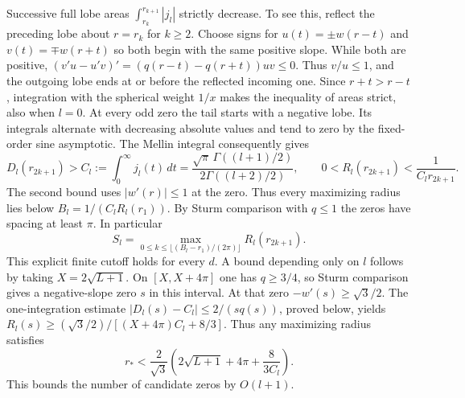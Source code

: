 \documentclass[11pt,a4paper]{article}
\theoremstyle{remark}\newtheorem{remark}[theorem]{Remark}
\numberwithin{equation}{section}
\begin{document}
Successive full lobe areas $\int_{r_k}^{r_{k+1}}|j_l|$ strictly decrease.
To see this, reflect the preceding lobe about $r=r_k$ for $k\ge2$.
Choose signs for $u(t)=\pm w(r-t)$ and $v(t)=\mp w(r+t)$ so both begin
with the same positive slope. While both are positive,
$(v'u-u'v)'=(q(r-t)-q(r+t))uv\le0$.
Thus $v/u\le1$, and the outgoing lobe ends at or before the reflected
incoming one. Since $r+t>r-t$, integration with the spherical weight $1/x$
makes the inequality of areas strict, also when $l=0$.
At every odd zero the tail starts with a negative lobe. Its integrals
alternate with decreasing absolute values and tend to zero
by the fixed-order sine asymptotic. The Mellin integral
\cite[eq.~10.22.43]{BBDLMF} consequently gives
\begin{equation}
 D_l(r_{2k+1})>C_l:=\int_0^\infty j_l(t)\,dt
 =\frac{\sqrt\pi\,\Gamma((l+1)/2)}{2\Gamma((l+2)/2)},\qquad
 0<R_l(r_{2k+1})<\frac{1}{C_l r_{2k+1}} .
 \label{eq:bb-tail}
\end{equation}
The second bound uses $|w'(r)|\le1$ at the zero.
Thus every maximizing radius lies below
$B_l=1/(C_lR_l(r_1))$. By Sturm comparison with $q\le1$ the zeros have
spacing at least $\pi$. In particular
\[
 S_l=\max_{0\le k\le \lfloor (B_l-r_1)/(2\pi)\rfloor}R_l(r_{2k+1}).
\]
This explicit finite cutoff holds for every $d$. A bound depending only on $l$ follows by taking $X=2\sqrt{L+1}$. On $[X,X+4\pi]$ one has $q\ge3/4$, so Sturm comparison gives a negative-slope zero $s$ in this interval. At that zero $-w'(s)\ge\sqrt3/2$. The one-integration estimate $|D_l(s)-C_l|\le2/(sq(s))$, proved below, yields $R_l(s)\ge(\sqrt3/2)/[(X+4\pi)C_l+8/3]$. Thus any maximizing radius satisfies
\[
 r_*<\frac{2}{\sqrt3}\left(2\sqrt{L+1}+4\pi+\frac{8}{3C_l}\right).
\]
This bounds the number of candidate zeros by $O(l+1)$.
\end{document}
